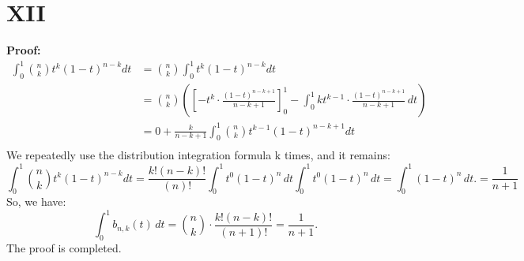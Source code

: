 \documentclass[a4paper]{article}
\begin{document}
\section*{XII}
\textbf{Proof:}
\begin{align*}
  \int_{0}^{1} \binom{n}{k}t^{k}(1-t)^{n-k}dt &= \binom{n}{k}\int_{0}^{1}t^{k}(1-t)^{n-k}dt\\
  &=\binom{n}{k}(\left[ -t^k \cdot \frac{(1-t)^{n-k+1}}{n-k+1} \right]_0^1-\int_0^1 k t^{k-1} \cdot \frac{(1-t)^{n-k+1}}{n-k+1} \,dt)\\
  &=0 + \frac{k}{n-k+1}\int_0^1 \binom{n}{k}t^{k-1}(1-t)^{n-k+1}dt\\
\end{align*}
We repeatedly use the distribution integration formula k times, and it remains:
\[
\int_{0}^{1} \binom{n}{k}t^{k}(1-t)^{n-k}dt = \frac{k!(n-k)!}{(n)!}\int_0^1 t^0 (1-t)^n \, dt
\int_0^1 t^0 (1-t)^n \, dt = \int_0^1 (1-t)^n \, dt. = \frac{1}{n+1}
\]
So, we have:
\[
\int_0^1 b_{n,k}(t) \, dt = \binom{n}{k} \cdot \frac{k! (n-k)!}{(n+1)!} = \frac{1}{n+1}.
\]
The proof is completed.
\section*{  }
\printbibliography
\end{document}
